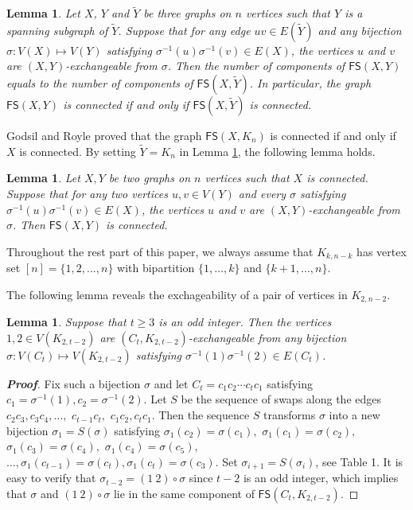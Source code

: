 \documentclass[11pt]{article}
\newtheorem{lem}[thm]{Lemma}%
\newcommand{\FS}{\mathsf{FS}}
\begin{document}
\begin{lem}\cite{ADK}\label{lem:exchangeable}
Let $X$, $Y$ and $\widetilde Y$ be three graphs on $n$ vertices such that $Y$ is a spanning subgraph of $\widetilde Y$.  Suppose that for any edge $uv\in E(\widetilde Y)$ and any bijection $\sigma:V(X)\mapsto V(Y)$ satisfying $\sigma^{-1}(u) \sigma^{-1}(v) \in E(X)$, the vertices $u$ and $v$ are $(X,Y)$-exchangeable from $\sigma$. Then the number of components of $\FS(X,Y)$ equals to the number of components of $\FS(X,\widetilde Y)$. In particular, the graph  $\FS(X,Y)$ is connected if and only if $\FS(X,\widetilde Y)$ is connected.
\end{lem}

Godsil and Royle \cite{GR} proved that the graph $\FS(X,K_n)$ is connected if and only if $X$ is connected.  By setting $\widetilde Y=K_n$ in Lemma \ref{lem:exchangeable}, the following lemma holds. 

\begin{lem} \cite{ADK} \label{ex}
 Let $X, Y$ be two graphs on $n$ vertices such that  $X$ is connected. Suppose that for any two vertices $u,v\in V(Y)$ and every $\sigma$ satisfying $\sigma^{-1}(u)\sigma^{-1}(v) \in E(X)$, the vertices $u$ and $v$ are $(X,Y)$-exchangeable from $\sigma$. Then $\mathsf{FS}(X,Y)$ is connected.
\end{lem}

 Throughout the rest part of this paper, we always assume that $K_{k,n-k}$ has vertex set $[n]=\{1,2,...,n\}$ with  bipartition $\{1,\dots, k\}$ and $\{k+1,\dots, n\}$.

The following lemma  reveals the exchageability of a pair of vertices in $K_{2,n-2}$.

\begin{lem}\label{l1}
Suppose that  $t\ge 3$ is an odd integer. Then the vertices $1, 2\in V(K_{2,t-2})$ are $(C_t, K_{2,t-2})$-exchangeable from any bijection $\sigma:V(C_t)\mapsto V(K_{2,t-2})$ satisfying $\sigma^{-1}(1)\sigma^{-1}(2)\in E(C_t)$. 
\end{lem}
\begin{proof} [\bfseries{Proof}]  Fix such a bijection $\sigma$ and let $C_t=c_1c_2\cdots c_tc_1$ satisfying $c_{1}=\sigma^{-1}(1), c_2=\sigma^{-1}(2)$. Let $S$ be the sequence of swaps along the edges  $c_2 c_3, c_3c_4,\dots,$ $c_{t-1} c_{t},$ $c_{1}c_2, c_{t}c_{1}$. Then the sequence $S$ transforms $\sigma$ into a new bijection $\sigma_1=S(\sigma)$ satisfying $\sigma_1(c_{2})=\sigma(c_{1}),$ $\sigma_1(c_{1})=\sigma(c_2),$ $ \sigma_1(c_{3})=\sigma(c_4),$ $\sigma_1(c_{4})=\sigma(c_{5}),$ $\dots,\sigma_1(c_{t-1})=\sigma(c_t),\sigma_1(c_t)=\sigma(c_3)$. Set $\sigma_{i+1}=S(\sigma_i)$, see Table 1. It is easy to verify that $\sigma_{t-2}=(1 \ 2)\circ \sigma$ since $t-2$ is an odd integer,  which implies that $\sigma$ and $(1 \ 2)\circ \sigma$ lie in the same component of $\FS(C_t,K_{2,t-2})$.
\end{proof}
\end{document}
